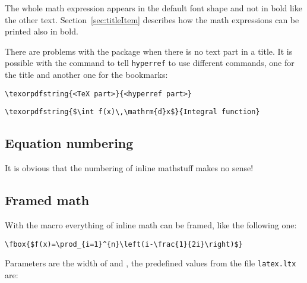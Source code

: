 The whole math expression appears in the default font shape and not
in bold like the other text. Section~\vref{sec:titleItem}  describes how the math
expressions can be printed also in bold.

%
There are problems with the  package  when there is no
text part in a title. It is possible with the command 
to tell \verb+hyperref+ to use different
commands, one for the title and another one for the bookmarks:

\begin{verbatim}
\texorpdfstring{<TeX part>}{<hyperref part>}
\end{verbatim}


\begin{minipage}{\fullwidth}
\begin{lstlisting}
\texorpdfstring{$\int f(x)\,\mathrm{d}x$}{Integral function}
\end{lstlisting}
\end{minipage}



\subsection{Equation numbering}

It is obvious that the numbering of inline mathstuff makes no sense!

\subsection{Framed math}
With the  macro everything of inline math can be framed, like the following one: 

\bigskip
\begin{minipage}{0.325\fullwidth}
\end{minipage}\hfill
\begin{minipage}{0.67\fullwidth}
\begin{lstlisting}
\fbox{$f(x)=\prod_{i=1}^{n}\left(i-\frac{1}{2i}\right)$}
\end{lstlisting}
\end{minipage}


Parameters are the width of  and , the predefined values
from the file \verb|latex.ltx| are:

